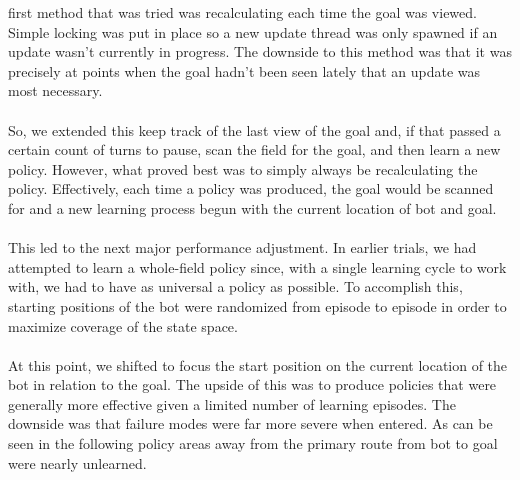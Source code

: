 \documentclass{aiaa-tc}%
\begin{document}
first method that was tried was recalculating each time the goal
was viewed. Simple locking was put in place so a new update thread was
only spawned if an update wasn't currently in progress. The downside
to this method was that it was precisely at points when the goal
hadn't been seen lately that an update was most necessary. \\ \\
So, we extended this keep track of the last view of the goal and, if
that passed a certain count of turns to pause, scan the field for the
goal, and then learn a new policy. However, what proved best was to
simply always be recalculating the policy. Effectively, each time a
policy was produced, the goal would be scanned for and a new learning
process begun with the current location of bot and goal. \\ \\
This led to the next major performance adjustment. In earlier trials,
we had attempted to learn a whole-field policy since, with a single
learning cycle to work with, we had to have as universal a policy as
possible. To accomplish this, starting positions of the bot were
randomized from episode to episode in order to maximize coverage of
the state space. \\ \\
At this point, we shifted to focus the start position
on the current location of the bot in relation to the goal. The upside
of this was to produce policies that were generally more effective
given a limited number of learning episodes. The downside was that
failure modes were far more severe when entered. As can be seen in the
following policy areas away from the primary route from bot to goal
were nearly unlearned.
\vspace{.3in}
\end{document}
